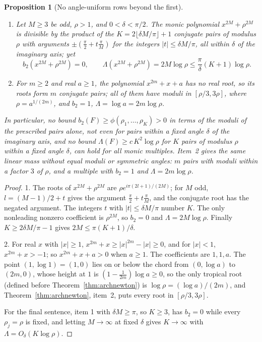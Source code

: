\documentclass[11pt]{article}
\newtheorem{proposition}[theorem]{Proposition}
\begin{document}
\begin{proposition}[No angle-uniform rows beyond the first]
\label{prop:noangle}
\leavevmode
\begin{enumerate}
\item Let $M\ge3$ be odd, $\rho>1$, and $0<\delta<\pi/2$.  The monic
polynomial $x^{2M}+\rho^{2M}$ is divisible by the product of the
$K=2\lfloor\delta M/\pi\rfloor+1$ conjugate pairs of modulus $\rho$ with
arguments $\pm(\frac\pi2+t\frac\pi M)$ for the integers $|t|\le\delta M/\pi$, all within
$\delta$ of the imaginary axis; yet
\[
  b_2(x^{2M}+\rho^{2M})=0,\qquad
  \Lambda(x^{2M}+\rho^{2M})=2M\log\rho\le\frac\pi\delta(K+1)\log\rho .
\]
\item For $m\ge2$ and real $a\ge1$, the polynomial $x^{2m}+x+a$ has no real
root, so its roots form $m$ conjugate pairs; all of them have moduli in
$[\rho/3,3\rho]$, where $\rho=a^{1/(2m)}$, and $b_2=1$,
$\Lambda=\log a=2m\log\rho$.
\end{enumerate}
In particular, no bound $b_2(F)\ge\phi(\rho_1,\ldots,\rho_K)>0$ in terms of
the moduli of the prescribed pairs alone, not even for pairs within a fixed
angle $\delta$ of the imaginary axis, and no bound
$\Lambda(F)\ge c\,K^2\log\rho$ for $K$ pairs of modulus $\rho$ within a
fixed angle $\delta$, can hold for all monic multiples.  Item~2 gives
the same linear mass without equal moduli or symmetric angles: $m$ pairs
with moduli within a factor $3$ of $\rho$, and a multiple with $b_2=1$ and
$\Lambda=2m\log\rho$.
\end{proposition}

\begin{proof}
1.  The roots of $x^{2M}+\rho^{2M}$ are $\rho e^{i\pi(2l+1)/(2M)}$; for
$M$ odd, $l=(M-1)/2+t$ gives the argument $\frac\pi2+t\frac\pi M$, and the
conjugate root has the negated argument.  The integers $t$ with
$|t|\le\delta M/\pi$ number $K$.  The only nonleading nonzero coefficient
is $\rho^{2M}$, so $b_2=0$ and $\Lambda=2M\log\rho$.  Finally
$K\ge2\delta M/\pi-1$ gives $2M\le\pi(K+1)/\delta$.

2.  For real $x$ with $|x|\ge1$, $x^{2m}+x\ge|x|^{2m}-|x|\ge0$, and for
$|x|<1$, $x^{2m}+x>-1$; so $x^{2m}+x+a>0$ when $a\ge1$.  The coefficients are
$1,1,a$.  The point $(1,\log1)=(1,0)$ lies on or below the chord from
$(0,\log a)$ to $(2m,0)$, whose height at $1$ is $(1-\frac1{2m})\log a\ge0$,
so the only tropical root (defined before Theorem~\ref{thm:archnewton}) is
$\log\rho=(\log a)/(2m)$, and Theorem~\ref{thm:archnewton}, item~2, puts every
root in $[\rho/3,3\rho]$.

For the final sentence, item 1 with $\delta M\ge\pi$, so $K\ge3$, has $b_2=0$ while every
$\rho_j=\rho$ is fixed, and letting $M\to\infty$ at fixed $\delta$ gives
$K\to\infty$ with $\Lambda=O_\delta(K\log\rho)$.
\end{proof}
\end{document}
